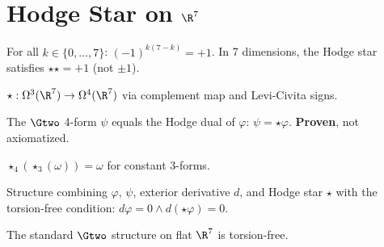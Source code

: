 \section{Hodge Star on $\R^7$}

\begin{theorem}\label{thm:starstar_sign}
    \leanok
    For all $k \in \{0, \ldots, 7\}$:
    $(-1)^{k(7-k)} = +1$.
    In 7 dimensions, the Hodge star satisfies $\star\star = +1$ (not $\pm 1$).
\end{theorem}

\begin{definition}\label{def:star3}
    \leanok
    $\star : \Omega^3(\R^7) \to \Omega^4(\R^7)$ via complement map and Levi-Civita signs.
\end{definition}

\begin{theorem}[$\psi = \star\varphi$ (Proven)]\label{thm:psi_eq_star_phi}
    \leanok
    The $\Gtwo$ 4-form $\psi$ equals the Hodge dual of $\varphi$:
    $\psi = \star\varphi$. \textbf{Proven}, not axiomatized.
\end{theorem}

\begin{theorem}\label{thm:hodge_invol}
    \leanok
    $\star_4(\star_3(\omega)) = \omega$ for constant 3-forms.
\end{theorem}

\begin{definition}\label{def:g2geomdata}
    \leanok
    Structure combining $\varphi$, $\psi$, exterior derivative $d$, and Hodge star $\star$
    with the torsion-free condition: $d\varphi = 0 \wedge d(\star\varphi) = 0$.
\end{definition}

\begin{theorem}\label{thm:standardG2Geom_tf}
    \leanok
    The standard $\Gtwo$ structure on flat $\R^7$ is torsion-free.
\end{theorem}

